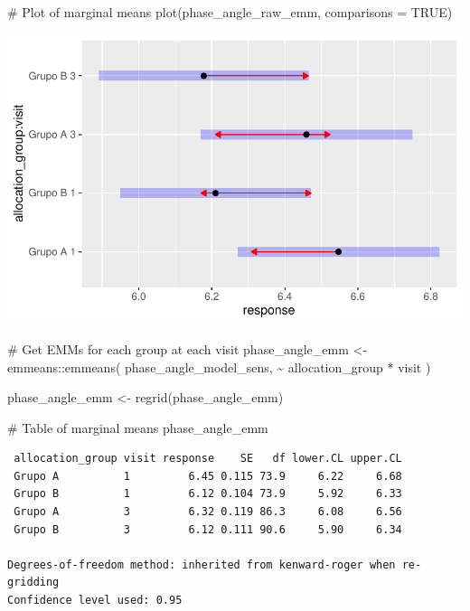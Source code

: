 \documentclass[
  letterpaper,
  DIV=11,
  numbers=noendperiod]{scrartcl}
\newenvironment{Shaded}{\begin{snugshade}}{\end{snugshade}}
\newcommand{\AttributeTok}[1]{\textcolor[rgb]{0.40,0.45,0.13}{#1}}
\newcommand{\CommentTok}[1]{\textcolor[rgb]{0.37,0.37,0.37}{#1}}
\newcommand{\ConstantTok}[1]{\textcolor[rgb]{0.56,0.35,0.01}{#1}}
\newcommand{\FunctionTok}[1]{\textcolor[rgb]{0.28,0.35,0.67}{#1}}
\newcommand{\NormalTok}[1]{\textcolor[rgb]{0.00,0.23,0.31}{#1}}
\newcommand{\OtherTok}[1]{\textcolor[rgb]{0.00,0.23,0.31}{#1}}
\newcommand{\SpecialCharTok}[1]{\textcolor[rgb]{0.37,0.37,0.37}{#1}}
\begin{document}
\begin{Shaded}
\begin{Highlighting}[]
\CommentTok{\# Plot of marginal means}
\FunctionTok{plot}\NormalTok{(phase\_angle\_raw\_emm, }\AttributeTok{comparisons =} \ConstantTok{TRUE}\NormalTok{)}
\end{Highlighting}
\end{Shaded}

\includegraphics{Outcomes_V1V2V3_files/figure-pdf/phase_angle_raw_emm-1.pdf}

\begin{Shaded}
\begin{Highlighting}[]
\CommentTok{\# Get EMMs for each group at each visit}
\NormalTok{phase\_angle\_emm }\OtherTok{\textless{}{-}}\NormalTok{ emmeans}\SpecialCharTok{::}\FunctionTok{emmeans}\NormalTok{(}
\NormalTok{    phase\_angle\_model\_sens, }
    \SpecialCharTok{\textasciitilde{}}\NormalTok{ allocation\_group }\SpecialCharTok{*}\NormalTok{ visit}
\NormalTok{)}

\NormalTok{phase\_angle\_emm }\OtherTok{\textless{}{-}} \FunctionTok{regrid}\NormalTok{(phase\_angle\_emm)}

\CommentTok{\# Table of marginal means}
\NormalTok{phase\_angle\_emm}
\end{Highlighting}
\end{Shaded}

\begin{verbatim}
 allocation_group visit response    SE   df lower.CL upper.CL
 Grupo A          1         6.45 0.115 73.9     6.22     6.68
 Grupo B          1         6.12 0.104 73.9     5.92     6.33
 Grupo A          3         6.32 0.119 86.3     6.08     6.56
 Grupo B          3         6.12 0.111 90.6     5.90     6.34

Degrees-of-freedom method: inherited from kenward-roger when re-gridding 
Confidence level used: 0.95 
\end{verbatim}
\end{document}
